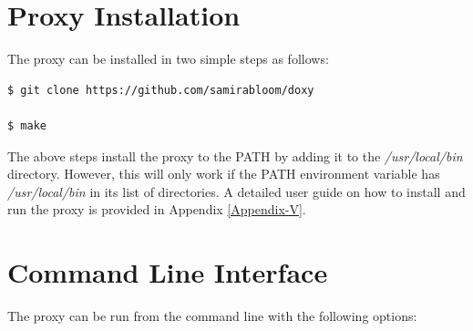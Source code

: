 \documentclass[a4paper,11pt,twoside]{report}
\begin{document}
\section{Proxy Installation}
The proxy can be installed in two simple steps as follows:

\begin{lstlisting}[language=terminal]
$ git clone https://github.com/samirabloom/doxy

$ make
\end{lstlisting}

\noindent
The above steps install the proxy to the PATH by adding it to the \textit{/usr/local/bin} directory. However, this will only work if the PATH environment variable has \textit{/usr/local/bin} in its list of directories. A detailed user guide on how to install and run the proxy is provided in Appendix \ref{Appendix-V}. 

\section{Command Line Interface}
The proxy can be run from the command line with the following options:\bigskip
\end{document}
